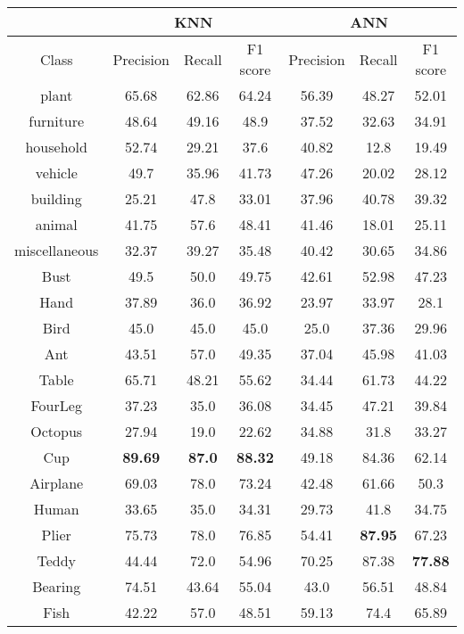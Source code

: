 \begin{table}[H]
    \centering
    \begin{tabular}{c|c|c|c|c|c|c}
         & \multicolumn{3}{c|}{KNN} & \multicolumn{3}{c}{ANN} \\
        \hline
        Class & Precision & Recall & F1 score & Precision & Recall & F1 score \\
        \hline
        plant & 65.68 & 62.86 & 64.24 & 56.39 & 48.27 & 52.01 \\ 
        furniture & 48.64 & 49.16 & 48.9 & 37.52 & 32.63 & 34.91 \\ 
        household & 52.74 & 29.21 & 37.6 & 40.82 & 12.8 & 19.49 \\ 
        vehicle & 49.7 & 35.96 & 41.73 & 47.26 & 20.02 & 28.12 \\ 
        building & 25.21 & 47.8 & 33.01 & 37.96 & 40.78 & 39.32 \\ 
        animal & 41.75 & 57.6 & 48.41 & 41.46 & 18.01 & 25.11 \\ 
        miscellaneous & 32.37 & 39.27 & 35.48 & 40.42 & 30.65 & 34.86 \\ 
        Bust & 49.5 & 50.0 & 49.75 & 42.61 & 52.98 & 47.23 \\ 
        Hand & 37.89 & 36.0 & 36.92 & 23.97 & 33.97 & 28.1 \\ 
        Bird & 45.0 & 45.0 & 45.0 & 25.0 & 37.36 & 29.96 \\ 
        Ant & 43.51 & 57.0 & 49.35 & 37.04 & 45.98 & 41.03 \\ 
        Table & 65.71 & 48.21 & 55.62 & 34.44 & 61.73 & 44.22 \\ 
        FourLeg & 37.23 & 35.0 & 36.08 & 34.45 & 47.21 & 39.84 \\ 
        Octopus & 27.94 & 19.0 & 22.62 & 34.88 & 31.8 & 33.27 \\ 
        Cup & \textbf{89.69} & \textbf{87.0} & \textbf{88.32} & 49.18 & 84.36 & 62.14 \\ 
        Airplane & 69.03 & 78.0 & 73.24 & 42.48 & 61.66 & 50.3 \\ 
        Human & 33.65 & 35.0 & 34.31 & 29.73 & 41.8 & 34.75 \\ 
        Plier & 75.73 & 78.0 & 76.85 & 54.41 & \textbf{87.95} & 67.23 \\ 
        Teddy & 44.44 & 72.0 & 54.96 & 70.25 & 87.38 & \textbf{77.88} \\ 
        Bearing & 74.51 & 43.64 & 55.04 & 43.0 & 56.51 & 48.84 \\ 
        Fish & 42.22 & 57.0 & 48.51 & 59.13 & 74.4 & 65.89 \\ 

\end{tabular}
\end{table}
